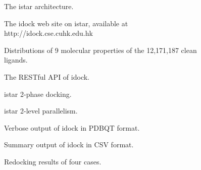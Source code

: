 \documentclass[12pt]{article}
\begin{document}

\clearpage





\clearpage

\begin{figure}
\caption{\label{architecture} The istar architecture.}
\end{figure}

\begin{figure}
\caption{\label{idock} The idock web site on istar, available at http://idock.cse.cuhk.edu.hk}
\end{figure}

\begin{figure}
\caption{\label{LigandProperties} Distributions of 9 molecular properties of the 12,171,187 clean ligands.}
\end{figure}

\begin{figure}
\caption{\label{idock-rest} The RESTful API of idock.}
\end{figure}

\begin{figure}
\caption{\label{2PhaseDocking} istar 2-phase docking.}
\end{figure}

\begin{figure}
\caption{\label{2LevelParallelism} istar 2-level parallelism.}
\end{figure}

\begin{figure}
\caption{\label{OutputPDBQT} Verbose output of idock in PDBQT format.}
\end{figure}

\begin{figure}
\caption{\label{OutputCSV} Summary output of idock in CSV format.}
\end{figure}

\begin{figure}
\caption{\label{Redocking} Redocking results of four cases.}
\end{figure}
\end{document}
